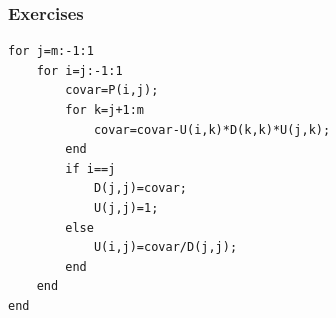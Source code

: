 \begin{frame}
\begin{itemize}
\end{itemize}
\end{frame}
\begin{frame}[fragile]
	\frametitle{Exercises} 
\begin{verbatim}
for j=m:-1:1
    for i=j:-1:1
        covar=P(i,j);
        for k=j+1:m
            covar=covar-U(i,k)*D(k,k)*U(j,k);
        end
        if i==j
            D(j,j)=covar;
            U(j,j)=1;
        else
            U(i,j)=covar/D(j,j);
        end
    end
end
\end{verbatim}
\end{frame}
